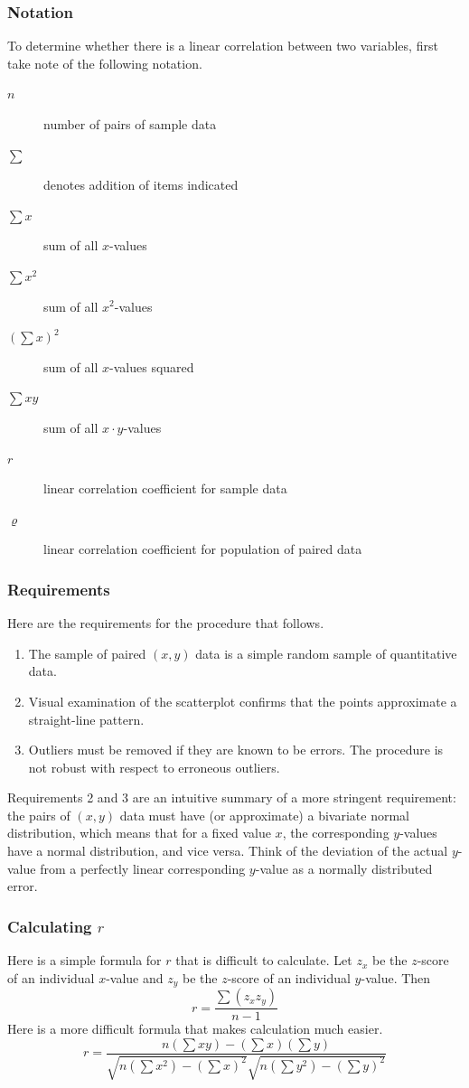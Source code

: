\documentclass[xcolor=dvipsnames]{beamer}
\begin{document}
\begin{frame}
  \frametitle{Notation}
  To determine whether there is a linear correlation between two
  variables, first take note of the following notation.
  \begin{description}
  \item[$n$] number of pairs of sample data
  \item[$\sum$] denotes addition of items indicated
  \item[$\sum{}x$] sum of all $x$-values
  \item[$\sum{}x^{2}$] sum of all $x^{2}$-values
  \item[$(\sum{}x)^{2}$] sum of all $x$-values squared
  \item[$\sum{}xy$] sum of all $x\cdot{}y$-values
  \item[$r$] linear correlation coefficient for sample data
  \item[$\varrho$] linear correlation coefficient for population of paired data
  \end{description}
\end{frame}

\begin{frame}
  \frametitle{Requirements}
  Here are the requirements for the procedure that follows.
  \begin{enumerate}
  \item The sample of paired $(x,y)$ data is a simple random sample of
    quantitative data.
  \item Visual examination of the scatterplot confirms that the points
    approximate a straight-line pattern.
  \item Outliers must be removed if they are known to be errors. The
    procedure is not robust with respect to erroneous outliers.
  \end{enumerate}
  Requirements 2 and 3 are an intuitive summary of a more stringent
  requirement: the pairs of $(x,y)$ data must have (or approximate) a
  \alert{bivariate normal distribution}, which means that for a fixed
  value $x$, the corresponding $y$-values have a normal distribution,
  and vice versa. Think of the deviation of the actual $y$-value from
  a perfectly linear corresponding $y$-value as a normally distributed
  error.
\end{frame}

\begin{frame}
  \frametitle{Calculating $r$}
  Here is a simple formula for $r$ that is difficult to calculate. Let
  $z_{x}$ be the $z$-score of an individual $x$-value and $z_{y}$ be
  the $z$-score of an individual $y$-value. Then
  \begin{equation}
    \label{eq:eegheela}
    r=\frac{\sum{}(z_{x}z_{y})}{n-1}
  \end{equation}
  Here is a more difficult formula that makes calculation much easier.
  \begin{equation}
    \label{eq:jeithoob}
    r=\frac{n\left(\sum{}xy\right)-\left(\sum{}x\right)\left(\sum{}y\right)}{\sqrt{n\left(\sum{}x^{2}\right)-\left(\sum{}x\right)^{2}}\sqrt{n\left(\sum{}y^{2}\right)-\left(\sum{}y\right)^{2}}}
  \end{equation}
\end{frame}
\end{document}
